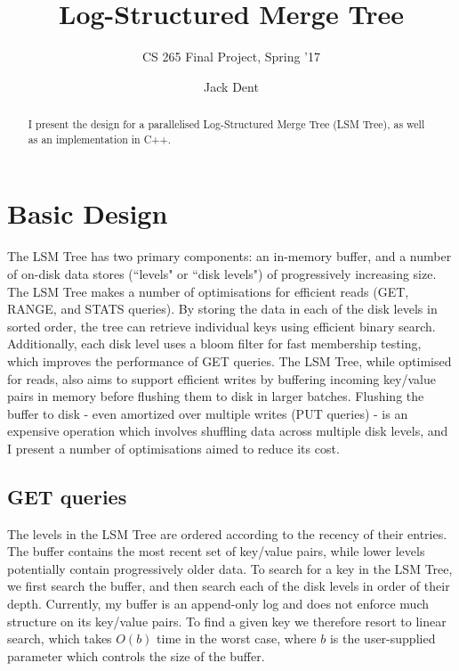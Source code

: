 \documentclass{acm}
\begin{document}
\title{Log-Structured Merge Tree}
\subtitle{CS 265 Final Project, Spring '17}
\author{Jack Dent\\}

\maketitle

\begin{abstract}
I present the design for a parallelised Log-Structured Merge Tree (LSM Tree), as well as an implementation in C++. 
\end{abstract}

\section{Basic Design}

The LSM Tree has two primary components: an in-memory buffer, and a number of on-disk data stores (``levels" or ``disk levels") of progressively increasing size. The LSM Tree makes a number of optimisations for efficient reads (GET, RANGE, and STATS queries). By storing the data in each of the disk levels in sorted order, the tree can retrieve individual keys using efficient binary search. Additionally, each disk level uses a bloom filter for fast membership testing, which improves the performance of GET queries. The LSM Tree, while optimised for reads, also aims to support efficient writes by buffering incoming key/value pairs in memory before flushing them to disk in larger batches. Flushing the buffer to disk - even amortized over multiple writes (PUT queries) - is an expensive operation which involves shuffling data across multiple disk levels, and I present a number of optimisations aimed to reduce its cost.

\subsection{GET queries}

The levels in the LSM Tree are ordered according to the recency of their entries. The buffer contains the most recent set of key/value pairs, while lower levels potentially contain progressively older data. To search for a key in the LSM Tree, we first search the buffer, and then search each of the disk levels in order of their depth. Currently, my buffer is an append-only log and does not enforce much structure on its key/value pairs. To find a given key we therefore resort to linear search, which takes $O(b)$ time in the worst case, where $b$ is the user-supplied parameter which controls the size of the buffer.
\end{document}
